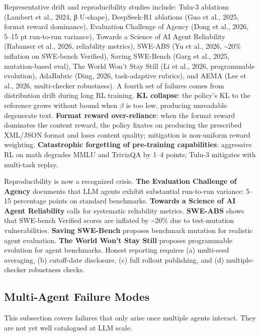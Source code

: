 \documentclass{article}
\begin{document}
Representative drift and reproducibility studies include: Tulu-3 ablations (Lambert et al., 2024, β U-shape), DeepSeek-R1 ablations (Guo et al., 2025, format reward dominance), Evaluation Challenge of Agency (Dong et al., 2026, 5--15 pt run-to-run variance), Towards a Science of AI Agent Reliability (Rabanser et al., 2026, reliability metrics), SWE-ABS (Yu et al., 2026, \textasciitilde20\% inflation on SWE-bench Verified), Saving SWE-Bench (Garg et al., 2025, mutation-based eval), The World Won't Stay Still (Li et al., 2026, programmable evolution), AdaRubric (Ding, 2026, task-adaptive rubrics), and AEMA (Lee et al., 2026, multi-checker robustness). A fourth set of failures comes from distribution drift during long RL training. \textbf{KL collapse}: the policy's KL to the reference grows without bound when \(\beta\) is too low, producing unreadable degenerate text. \textbf{Format reward over-reliance}: when the format reward dominates the content reward, the policy fixates on producing the prescribed XML/JSON format and loses content quality; mitigation is non-uniform reward weighting. \textbf{Catastrophic forgetting of pre-training capabilities}: aggressive RL on math degrades MMLU and TriviaQA by 1--4 points; Tulu-3 mitigates with multi-task replay.

Reproducibility is now a recognized crisis. \textbf{The Evaluation Challenge of Agency} \citep{dong20262026} documents that LLM agents exhibit substantial run-to-run variance: 5--15 percentage points on standard benchmarks. \textbf{Towards a Science of AI Agent Reliability} \citep{rabanser20262026} calls for systematic reliability metrics. \textbf{SWE-ABS} \citep{yu20262026} shows that SWE-bench Verified scores are inflated by \textasciitilde20\% due to test-mutation vulnerabilities. \textbf{Saving SWE-Bench} \citep{garg2025savingswebenchaben} proposes benchmark mutation for realistic agent evaluation. \textbf{The World Won't Stay Still} \citep{li20262026} proposes programmable evolution for agent benchmarks. Honest reporting requires (a) multi-seed averaging, (b) cutoff-date disclosure, (c) full rollout publishing, and (d) multiple-checker robustness checks.

\subsection{Multi-Agent Failure Modes}\label{multi-agent-failure-modes}

This subsection covers failures that only arise once multiple agents interact. They are not yet well catalogued at LLM scale.
\end{document}
